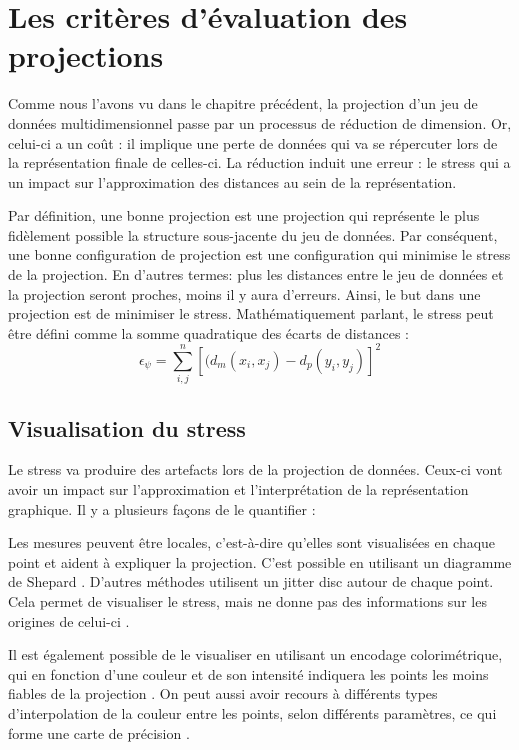 \section{Les critères d'évaluation des projections}

Comme nous l’avons vu dans le chapitre précédent, la projection d'un jeu de données multidimensionnel passe par un processus de réduction de dimension. 
Or, celui-ci a un coût : il implique une perte de données qui va se répercuter lors de la représentation finale de celles-ci.\smallskip
La réduction induit une erreur : le stress qui a un impact sur l’approximation des distances au sein de la représentation.

Par définition, une bonne projection est une projection qui représente le plus fidèlement
possible la structure sous-jacente du jeu de données. Par conséquent, une
bonne configuration de projection est une configuration qui minimise le stress de la
projection. En d'autres termes: plus les distances entre le jeu de données et la projection seront proches, moins il y aura d’erreurs.
Ainsi, le but dans une projection est de minimiser le stress. \newline 
Mathématiquement parlant, le stress peut être défini comme la somme
quadratique des écarts de distances :  \[\epsilon_\psi = \sum_{i,j}^{n}[(d_m (x_i , x_j )- d_p (y_i ,y_j )]^{2} \] 


\subsection{Visualisation du stress}

Le stress va produire des artefacts lors de la projection de données. Ceux-ci vont
avoir un impact sur l’approximation et l'interprétation de la représentation graphique. Il y a
plusieurs façons de le quantifier :

Les mesures peuvent être locales, c'est-à-dire qu'elles sont visualisées en chaque point et aident à expliquer
la projection. C’est possible en utilisant un diagramme de Shepard \cite{kruskal1964multidimensional} \cite{HeulotThese}.
D'autres méthodes utilisent un jitter disc autour de chaque point. Cela permet de visualiser le
stress, mais ne donne pas des informations sur les origines de celui-ci \cite{HeulotAnEvaluation}.

Il est également possible de le visualiser en utilisant un encodage colorimétrique, qui en
fonction d’une couleur et de son intensité indiquera les points les moins fiables de la
projection \cite{CheckViz}.
On peut aussi avoir recours à différents types d’interpolation de la couleur entre les points,
selon différents paramètres, ce qui forme une carte de précision \cite{schreck2010techniques}.
\smallskip


